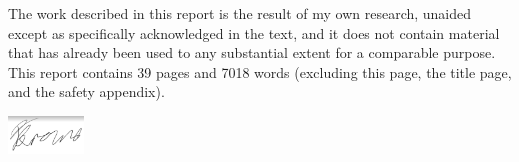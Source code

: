 
\begin{declaration}
    \graphicspath{{Declaration/}}


    The work described in this report is the result of my own research, unaided except as specifically acknowledged in the text, and it does not contain material that has already been used to any substantial extent for a comparable purpose. This report contains 39 pages and 7018 words (excluding this page, the title page, and the safety appendix).

    \begin{flushright}
        \includegraphics[width=20mm]{sig.png}
    \end{flushright}

\end{declaration}

